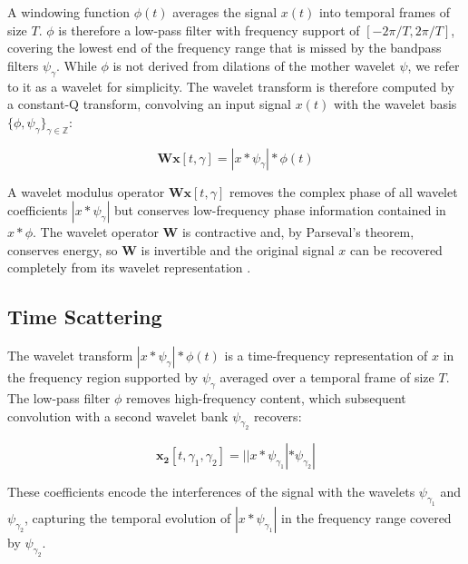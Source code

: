 A windowing function $\phi(t)$ averages the signal $x(t)$ into temporal frames of size $T$. $\phi$ is therefore a low-pass filter with frequency support of $[-2\pi/T, 2\pi/T]$, covering the lowest end of the frequency range that is missed by the bandpass filters $\psi_{\gamma}$. While $\phi$ is not derived from dilations of the mother wavelet $\psi$, we refer to it as a wavelet for simplicity.  
The wavelet transform is therefore computed by a constant-Q transform, convolving an input signal $x(t)$ with the wavelet basis $\{\phi, \psi_{\gamma}\}_{\gamma \in \mathbb{Z}}$: 

\begin{equation}
\mathbf{Wx}[t, \gamma]  = | x \ast \psi_{\gamma} | \ast \phi(t)
\end{equation}

A wavelet modulus operator $\mathbf{Wx}[t, \gamma] $ removes the complex phase of all wavelet coefficients $|x \ast \psi_{\gamma}|$ but conserves low-frequency phase information contained in $x \ast \phi$. The wavelet operator $\mathbf{W}$ is contractive and, by Parseval's theorem, conserves energy, so $\mathbf{W}$ is invertible and the original signal $x$ can be recovered completely from its wavelet representation \cite{anden2014deep}. 


\subsection{Time Scattering}
\label{sec:timescattering}

The wavelet transform $| x \ast \psi_{\gamma} | \ast \phi(t)$ is a time-frequency representation of $x$ in the frequency region supported by $\psi_{\gamma}$ averaged over a temporal frame of size $T$. The low-pass filter $\phi$ removes high-frequency content, which subsequent convolution with a second wavelet bank $\psi_{\gamma_2}$ recovers:

\begin{equation}
\mathbf{x_2} [t, \gamma_1, \gamma_2] = || x \ast \psi_{\gamma_1} | \ast \psi_{\gamma_2} |
\end{equation}

These coefficients encode the interferences of the signal with the wavelets $\psi_{\gamma_1}$ and $\psi_{\gamma_2}$, capturing the temporal evolution of $|x \ast \psi_{\gamma_1}|$ in the frequency range covered by $\psi_{\gamma_2}$. 

